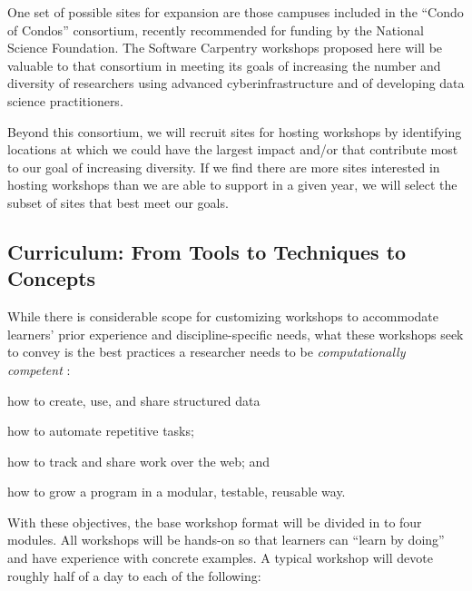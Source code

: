 \documentclass{proposalnsf}
\newlength{\up}
\begin{document}
One set of possible sites for expansion are those campuses included in
the ``Condo of Condos'' consortium, recently recommended for funding
by the National Science Foundation.  The Software Carpentry workshops
proposed here will be valuable to that consortium in meeting its goals
of increasing the number and diversity of researchers using advanced
cyberinfrastructure and of developing data science practitioners.

Beyond this consortium, we will recruit sites for hosting workshops by identifying locations at which we could have the largest impact and/or that contribute most to our goal of increasing diversity. If we find there are more sites interested in hosting workshops than we are able to support in a given year, we will select the subset of sites that best meet our goals.

\subsection{Curriculum: From Tools to Techniques to Concepts}
\label{sec:workshops}

While there is considerable scope for customizing workshops to
accommodate learners' prior experience and discipline-specific needs,
what these workshops seek to convey is the best
practices a researcher needs to be \emph{computationally competent}
\cite{wilson2013}:

\begin{compactitem}
\item
  how to create, use, and share structured data
\item
  how to automate repetitive tasks; 
\item
  how to track and share work over the web; and
\item
  how to grow a program in a modular, testable, reusable way.
\end{compactitem}

With these objectives, the base workshop format will be divided in to
four modules.  All workshops will be hands-on so that learners can
``learn by doing'' and have experience with concrete examples. A
typical workshop will devote roughly half of a day to each of the
following:
\end{document}
